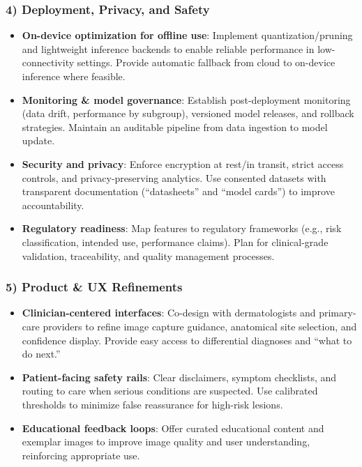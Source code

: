 \documentclass[
  12pt,
  oneside]{article}
\providecommand{\tightlist}{%
  \setlength{\itemsep}{0pt}\setlength{\parskip}{0pt}}
\begin{document}
\subsubsection{4) Deployment, Privacy, and
Safety}\label{deployment-privacy-and-safety}

\begin{itemize}
\tightlist
\item
  \textbf{On-device optimization for offline use}: Implement
  quantization/pruning and lightweight inference backends to enable
  reliable performance in low-connectivity settings. Provide automatic
  fallback from cloud to on-device inference where feasible.
\item
  \textbf{Monitoring \& model governance}: Establish post-deployment
  monitoring (data drift, performance by subgroup), versioned model
  releases, and rollback strategies. Maintain an auditable pipeline from
  data ingestion to model update.
\item
  \textbf{Security and privacy}: Enforce encryption at rest/in transit,
  strict access controls, and privacy-preserving analytics. Use
  consented datasets with transparent documentation (``datasheets'' and
  ``model cards'') to improve accountability.
\item
  \textbf{Regulatory readiness}: Map features to regulatory frameworks
  (e.g., risk classification, intended use, performance claims). Plan
  for clinical-grade validation, traceability, and quality management
  processes.
\end{itemize}

\subsubsection{5) Product \& UX
Refinements}\label{product-ux-refinements}

\begin{itemize}
\tightlist
\item
  \textbf{Clinician-centered interfaces}: Co-design with dermatologists
  and primary-care providers to refine image capture guidance,
  anatomical site selection, and confidence display. Provide easy access
  to differential diagnoses and ``what to do next.''
\item
  \textbf{Patient-facing safety rails}: Clear disclaimers, symptom
  checklists, and routing to care when serious conditions are suspected.
  Use calibrated thresholds to minimize false reassurance for high-risk
  lesions.
\item
  \textbf{Educational feedback loops}: Offer curated educational content
  and exemplar images to improve image quality and user understanding,
  reinforcing appropriate use.
\end{itemize}
\end{document}

